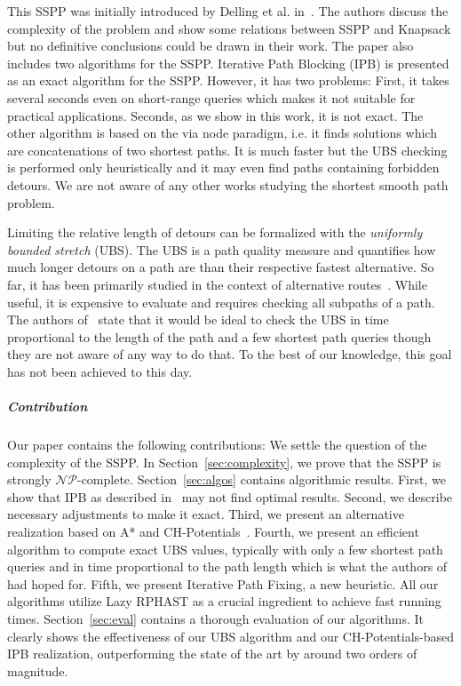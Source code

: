 \documentclass[a4paper,UKenglish,cleveref, autoref, thm-restate]{lipics-v2021}
\begin{document}
This SSPP was initially introduced by Delling et al. in~\cite{dss-tarrn-18}.
The authors discuss the complexity of the problem and show some relations between SSPP and Knapsack but no definitive conclusions could be drawn in their work.
The paper also includes two algorithms for the SSPP.
Iterative Path Blocking (IPB) is presented as an exact algorithm for the SSPP.
However, it has two problems:
First, it takes several seconds even on short-range queries which makes it not suitable for practical applications.
Seconds, as we show in this work, it is not exact.
The other algorithm is based on the via node paradigm, i.e. it finds solutions which are concatenations of two shortest paths.
It is much faster but the UBS checking is performed only heuristically and it may even find paths containing forbidden detours.
We are not aware of any other works studying the shortest smooth path problem.

Limiting the relative length of detours can be formalized with the \emph{uniformly bounded stretch} (UBS).
The UBS is a path quality measure and quantifies how much longer detours on a path are than their respective fastest alternative.
So far, it has been primarily studied in the context of alternative routes~\cite{adgw-arrn-13}.
While useful, it is expensive to evaluate and requires checking all subpaths of a path.
The authors of~\cite{adgw-arrn-13} state that it would be ideal to check the UBS in time proportional to the length of the path and a few shortest path queries though they are not aware of any way to do that.
To the best of our knowledge, this goal has not been achieved to this day.

\subparagraph{Contribution}

Our paper contains the following contributions:
We settle the question of the complexity of the SSPP.
In Section~\ref{sec:complexity}, we prove that the SSPP is strongly $\mathcal{NP}$-complete.
Section~\ref{sec:algos} contains algorithmic results.
First, we show that IPB as described in~\cite{dss-tarrn-18} may not find optimal results.
Second, we describe necessary adjustments to make it exact.
Third, we present an alternative realization based on A* and CH-Potentials~\cite{strasser_et_al:LIPIcs.SEA.2021.6}.
Fourth, we present an efficient algorithm to compute exact UBS values, typically with only a few shortest path queries and in time proportional to the path length which is what the authors of~\cite{adgw-arrn-13} had hoped for.
Fifth, we present Iterative Path Fixing, a new heuristic.
All our algorithms utilize Lazy RPHAST as a crucial ingredient to achieve fast running times.
Section~\ref{sec:eval} contains a thorough evaluation of our algorithms.
It clearly shows the effectiveness of our UBS algorithm and our CH-Potentials-based IPB realization, outperforming the state of the art by around two orders of magnitude.
\end{document}
